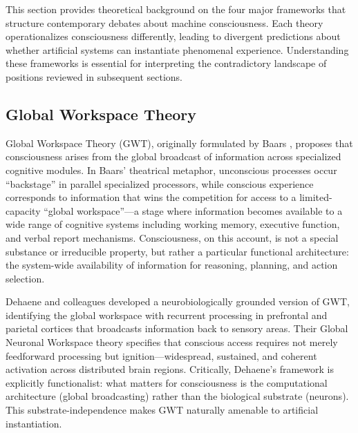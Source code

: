 
This section provides theoretical background on the four major frameworks that structure
contemporary debates about machine consciousness. Each theory operationalizes consciousness
differently, leading to divergent predictions about whether artificial systems can instantiate
phenomenal experience. Understanding these frameworks is essential for interpreting the
contradictory landscape of positions reviewed in subsequent sections.

\subsection{Global Workspace Theory}

Global Workspace Theory (GWT), originally formulated by Baars \cite{baars1988cognitive},
proposes that consciousness arises from the global broadcast of information across specialized
cognitive modules. In Baars' theatrical metaphor, unconscious processes occur ``backstage''
in parallel specialized processors, while conscious experience corresponds to information
that wins the competition for access to a limited-capacity ``global workspace''---a stage
where information becomes available to a wide range of cognitive systems including working
memory, executive function, and verbal report mechanisms. Consciousness, on this account, is
not a special substance or irreducible property, but rather a particular functional
architecture: the system-wide availability of information for reasoning, planning, and
action selection.

Dehaene and colleagues \cite{dehaene2014toward} developed a neurobiologically grounded
version of GWT, identifying the global workspace with recurrent processing in prefrontal
and parietal cortices that broadcasts information back to sensory areas. Their Global
Neuronal Workspace theory specifies that conscious access requires not merely feedforward
processing but ignition---widespread, sustained, and coherent activation across distributed
brain regions. Critically, Dehaene's framework is explicitly functionalist: what matters
for consciousness is the computational architecture (global broadcasting) rather than the
biological substrate (neurons). This substrate-independence makes GWT naturally amenable
to artificial instantiation.

